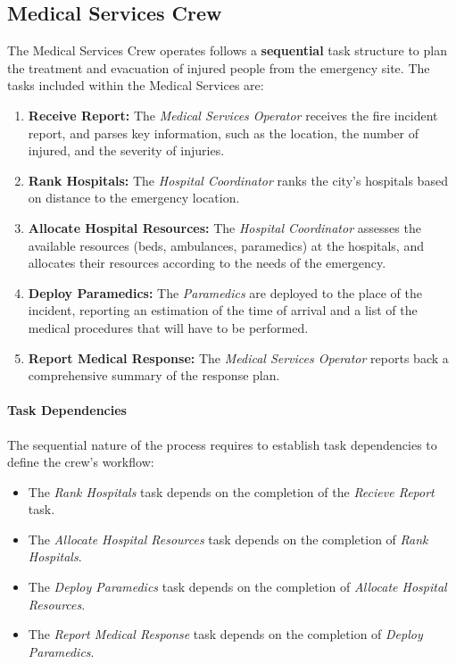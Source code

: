 \subsection{Medical Services Crew}

The Medical Services Crew operates follows a \textbf{sequential} task structure to plan the treatment and evacuation of injured people from the emergency site. The tasks included within the Medical Services are:

\begin{enumerate}
	\item \textbf{Receive Report:} The \textit{Medical Services Operator} receives the fire incident report, and parses key information, such as the location, the number of injured, and the severity of injuries.
	
	\item \textbf{Rank Hospitals:} The \textit{Hospital Coordinator} ranks the city's hospitals based on distance to the emergency location.

	\item \textbf{Allocate Hospital Resources:} The \textit{Hospital Coordinator} assesses the available resources (beds, ambulances, paramedics) at the hospitals, and allocates their resources according to the needs of the emergency.
	
	\item \textbf{Deploy Paramedics:} The \textit{Paramedics} are deployed to the place of the incident, reporting an estimation of the time of arrival and a list of the medical procedures that will have to be performed.
	
	\item \textbf{Report Medical Response:} The \textit{Medical Services Operator} reports back a comprehensive summary of the response plan.
\end{enumerate}

\paragraph{Task Dependencies}
The sequential nature of the process requires to establish task dependencies to define the crew's workflow:
\begin{itemize}
	\item The \textit{Rank Hospitals} task depends on the completion of the \textit{Recieve Report} task.
	\item The \textit{Allocate Hospital Resources} task depends on the completion of \textit{Rank Hospitals}.
	\item The \textit{Deploy Paramedics} task depends on the completion of \textit{Allocate Hospital Resources}.
	\item The \textit{Report Medical Response} task depends on the completion of \textit{Deploy Paramedics}.
\end{itemize}

